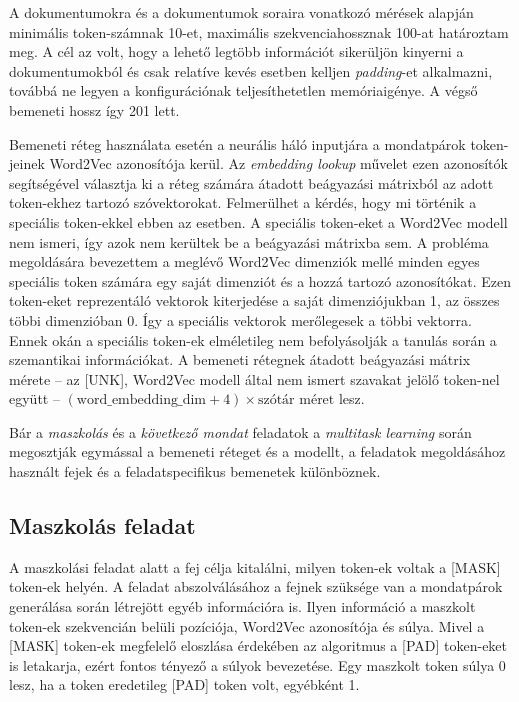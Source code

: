A dokumentumokra és a dokumentumok soraira vonatkozó mérések alapján minimális token-számnak 10-et, maximális szekvenciahossznak 100-at határoztam meg. A cél az volt, hogy a lehető legtöbb információt sikerüljön kinyerni a dokumentumokból és csak relatíve kevés esetben kelljen \textit{padding}-et alkalmazni, továbbá ne legyen a konfigurációnak teljesíthetetlen memóriaigénye. A végső bemeneti hossz így 201 lett.

Bemeneti réteg használata esetén a neurális háló inputjára a mondatpárok token-jeinek Word2Vec azonosítója kerül. Az \textit{embedding lookup} művelet ezen azonosítók segítségével választja ki a réteg számára átadott beágyazási mátrixból az adott token-ekhez tartozó szóvektorokat. Felmerülhet a kérdés, hogy mi történik a speciális token-ekkel ebben az esetben. A speciális token-eket a Word2Vec modell nem ismeri, így azok nem kerültek be a beágyazási mátrixba sem. A probléma megoldására bevezettem a meglévő Word2Vec dimenziók mellé minden egyes speciális token számára egy saját dimenziót és a hozzá tartozó azonosítókat. Ezen token-eket reprezentáló vektorok kiterjedése a saját dimenziójukban 1, az összes többi dimenzióban 0. Így a speciális vektorok merőlegesek a többi vektorra. Ennek okán a speciális token-ek elméletileg nem befolyásolják a tanulás során a szemantikai információkat. A bemeneti rétegnek átadott beágyazási mátrix mérete – az [UNK], Word2Vec modell által nem ismert szavakat jelölő token-nel együtt – $(\text{word\_embedding\_dim} + 4) \times \text{szótár méret} $ lesz.

Bár a \textit{maszkolás} és a \textit{következő mondat} feladatok a \textit{multitask learning} során megosztják egymással a bemeneti réteget és a modellt, a feladatok megoldásához használt fejek és a feladatspecifikus bemenetek különböznek.

\subsection{Maszkolás feladat}

A maszkolási feladat alatt a fej célja kitalálni, milyen token-ek voltak a [MASK] token-ek helyén. A feladat abszolválásához a fejnek szüksége van a mondatpárok generálása során létrejött egyéb információra is. Ilyen információ a maszkolt token-ek szekvencián belüli pozíciója, Word2Vec azonosítója és súlya. Mivel a [MASK] token-ek megfelelő eloszlása érdekében az algoritmus a [PAD] token-eket is letakarja, ezért fontos tényező a súlyok bevezetése. Egy maszkolt token súlya 0 lesz, ha a token eredetileg [PAD] token volt, egyébként 1. 

